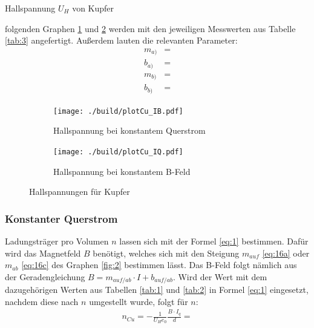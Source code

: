 \begin{table}[H]
    \centering
    
    \caption{Hallspannung $U_H$ von Kupfer}
    \label{tab:3}
\end{table}

\justifying folgenden Graphen \ref{fig:3a} und \ref{fig:3b} werden mit den jeweiligen Messwerten aus Tabelle \ref{tab:3} 
angefertigt. Außerdem lauten die relevanten Parameter: 
\begin{subequations} \label{eq:17}
\begin{align}
    m_{a)} &= \text{} \label{eq:17a}\\
    b_{a)} &= \text{} \label{eq:17b}\\
    m_{b)} &= \text{} \label{eq:17c}\\
    b_{b)} &= \text{} \label{eq:17d}
\end{align}
\end{subequations}

\begin{figure}[H]
\begin{subfigure}{0.495\linewidth}
\centering
\texttt{[image: ./build/plotCu\_IB.pdf]}
\caption{Hallspannung bei konstantem Querstrom}
\label{fig:3a}
\end{subfigure}
\begin{subfigure}{0.495\linewidth}
\centering
\texttt{[image: ./build/plotCu\_IQ.pdf]}
\caption{Hallspannung bei konstantem B-Feld}
\label{fig:3b}
\end{subfigure}
\caption{Hallspannungen für Kupfer}
\label{fig:3}
\end{figure}

\subsubsection{Konstanter Querstrom} \label{sec:5.3.1}
 
\justifying Ladungsträger pro Volumen $n$ lassen sich mit der Formel \eqref{eq:1} bestimmen. Dafür wird das Magnetfeld $B$
benötigt, welches sich mit den Steigung $m_{auf}$ \eqref{eq:16a} oder $m_{ab}$ \eqref{eq:16c} des Graphen \ref{fig:2} bestimmen lässt. 
Das B-Feld folgt nämlich aus der Geradengleichung $B = m_{auf/ab} \cdot I + b_{auf/ab}$. Wird der Wert mit dem dazugehörigen Werten aus
Tabellen \ref{tab:1} und \ref{tab:2} in Formel \eqref{eq:1} eingesetzt, nachdem diese nach $n$ umgestellt wurde, folgt für $n$:
\begin{align}
    n_{Cu} = - \frac{1}{U_H e_0} \frac{B \cdot I_q}{d} = \text{} \label{eq:18}
\end{align}

